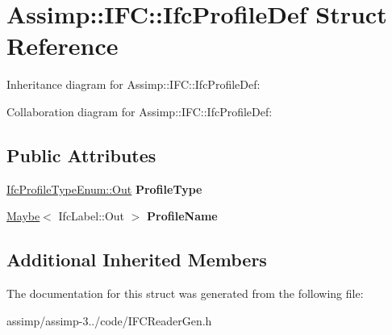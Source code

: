 \hypertarget{struct_assimp_1_1_i_f_c_1_1_ifc_profile_def}{\section{Assimp\+:\+:I\+F\+C\+:\+:Ifc\+Profile\+Def Struct Reference}
\label{struct_assimp_1_1_i_f_c_1_1_ifc_profile_def}
}


Inheritance diagram for Assimp\+:\+:I\+F\+C\+:\+:Ifc\+Profile\+Def\+:


Collaboration diagram for Assimp\+:\+:I\+F\+C\+:\+:Ifc\+Profile\+Def\+:
\subsection*{Public Attributes}
\begin{DoxyCompactItemize}
\item 
\hypertarget{struct_assimp_1_1_i_f_c_1_1_ifc_profile_def_a145116625bdbb00e080d986862ce53c2}{\hyperlink{classboost_1_1shared__ptr}{Ifc\+Profile\+Type\+Enum\+::\+Out} {\bfseries Profile\+Type}}\label{struct_assimp_1_1_i_f_c_1_1_ifc_profile_def_a145116625bdbb00e080d986862ce53c2}

\item 
\hypertarget{struct_assimp_1_1_i_f_c_1_1_ifc_profile_def_a50300a533c287b36131f7a38a05764bd}{\hyperlink{struct_assimp_1_1_s_t_e_p_1_1_maybe}{Maybe}$<$ Ifc\+Label\+::\+Out $>$ {\bfseries Profile\+Name}}\label{struct_assimp_1_1_i_f_c_1_1_ifc_profile_def_a50300a533c287b36131f7a38a05764bd}

\end{DoxyCompactItemize}
\subsection*{Additional Inherited Members}


The documentation for this struct was generated from the following file\+:\begin{DoxyCompactItemize}
\item 
assimp/assimp-\/3../code/I\+F\+C\+Reader\+Gen.\+h\end{DoxyCompactItemize}
